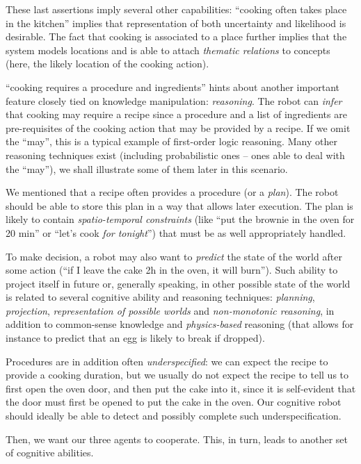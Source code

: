 These last assertions imply several other capabilities: ``cooking often takes
place in the kitchen'' implies that representation of both uncertainty and
likelihood is desirable. The fact that cooking is associated to a place further
implies that the system models locations and is able to attach \emph{thematic
relations} to concepts (here, the likely location of the cooking action).

``cooking requires a procedure and ingredients'' hints about another important
feature closely tied on knowledge manipulation: \emph{reasoning}. The robot can
\emph{infer} that cooking may require a recipe since a procedure and a list of
ingredients are pre-requisites of the cooking action that may be provided by a
recipe.  If we omit the ``may'', this is a typical example of first-order logic
reasoning.  Many other reasoning techniques exist (including probabilistic ones
-- ones able to deal with the ``may''), we shall illustrate some of them later
in this scenario.

We mentioned that a recipe often provides a procedure (or a \emph{plan}). The
robot should be able to store this plan in a way that allows later execution.
The plan is likely to contain \emph{spatio-temporal constraints} (like ``put
the brownie in the oven for 20 min'' or ``let's cook \emph{for tonight}'') that
must be as well appropriately handled.

To make decision, a robot may also want to \emph{predict} the state of the
world after some action (``if I leave the cake 2h in the oven, it will burn'').
Such ability to project itself in future or, generally speaking, in other
possible state of the world is related to several cognitive ability and
reasoning techniques: \emph{planning}, \emph{projection}, \emph{representation
of possible worlds} and \emph{non-monotonic reasoning}, in addition to
common-sense knowledge and \emph{physics-based} reasoning (that allows for
instance to predict that an egg is likely to break if dropped).

Procedures are in addition often \emph{underspecified}: we can expect the
recipe to provide a cooking duration, but we usually do not expect the recipe
to tell us to first open the oven door, and then put the cake into it, since it
is self-evident that the door must first be opened to put the cake in the oven.
Our cognitive robot should ideally be able to detect and possibly complete such
underspecification.

Then, we want our three agents to cooperate. This, in turn, leads to another
set of cognitive abilities.


